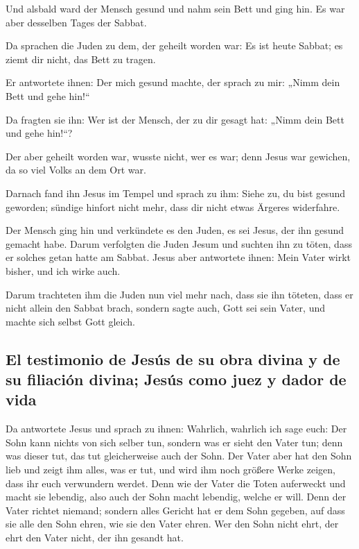  Und alsbald ward der Mensch gesund und nahm sein Bett und
ging hin. Es war aber desselben Tages der Sabbat.

 Da sprachen die Juden zu dem, der geheilt worden war: Es
ist heute Sabbat; es ziemt dir nicht, das Bett zu tragen.

 Er antwortete ihnen: Der mich gesund machte, der sprach
zu mir: „Nimm dein Bett und gehe hin!{}``

 Da fragten sie ihn: Wer ist der Mensch, der zu dir
gesagt hat: „Nimm dein Bett und gehe hin!{}``?

 Der aber geheilt worden war, wusste nicht, wer es war;
denn Jesus war gewichen, da so viel Volks an dem Ort war.

 Darnach fand ihn Jesus im Tempel und sprach zu ihm:
Siehe zu, du bist gesund geworden; sündige hinfort nicht mehr, dass dir
nicht etwas Ärgeres widerfahre.

 Der Mensch ging hin und verkündete es den Juden, es sei
Jesus, der ihn gesund gemacht habe.  Darum verfolgten die
Juden Jesum und suchten ihn zu töten, dass er solches getan hatte am
Sabbat.  Jesus aber antwortete ihnen: Mein Vater wirkt
bisher, und ich wirke auch.

 Darum trachteten ihm die Juden nun viel mehr nach, dass
sie ihn töteten, dass er nicht allein den Sabbat brach, sondern sagte
auch, Gott sei sein Vater, und machte sich selbst Gott gleich.

\hypertarget{el-testimonio-de-jesuxfas-de-su-obra-divina-y-de-su-filiaciuxf3n-divina-jesuxfas-como-juez-y-dador-de-vida}{%
\subsection{El testimonio de Jesús de su obra divina y de su filiación
divina; Jesús como juez y dador de
vida}\label{el-testimonio-de-jesuxfas-de-su-obra-divina-y-de-su-filiaciuxf3n-divina-jesuxfas-como-juez-y-dador-de-vida}}

 Da antwortete Jesus und sprach zu ihnen: Wahrlich,
wahrlich ich sage euch: Der Sohn kann nichts von sich selber tun,
sondern was er sieht den Vater tun; denn was dieser tut, das tut
gleicherweise auch der Sohn.  Der Vater aber hat den Sohn
lieb und zeigt ihm alles, was er tut, und wird ihm noch größere Werke
zeigen, dass ihr euch verwundern werdet.  Denn wie der
Vater die Toten auferweckt und macht sie lebendig, also auch der Sohn
macht lebendig, welche er will.  Denn der Vater richtet
niemand; sondern alles Gericht hat er dem Sohn gegeben, 
auf dass sie alle den Sohn ehren, wie sie den Vater ehren. Wer den Sohn
nicht ehrt, der ehrt den Vater nicht, der ihn gesandt hat.


